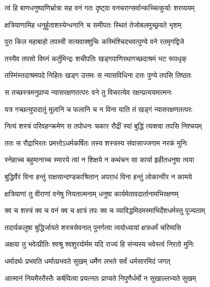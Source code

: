 \twolineshloka
{त्वं हि बाणधनुष्पाणिर्भ्रात्रा सह वनं गतः}
{दृष्ट्वा वनचरान्सर्वान्कच्चित्कुर्याः शरव्ययम्} %

\twolineshloka
{क्षत्रियाणामिह धनुर्हुताशस्येन्धनानि च}
{समीपतः स्थितं तेजोबलमुच्छ्रयते भृशम्} %

\twolineshloka
{पुरा किल महाबाहो तपस्वी सत्यवाक्शुचिः}
{कस्मिंश्चिदभवत्पुण्ये वने रतमृगद्विजे} %

\twolineshloka
{तस्यैव तपसो विघ्नं कर्तुमिन्द्रः शचीपतिः}
{खड्गपाणिरथागच्छदाश्रमं भट रूपधृक्} %

\twolineshloka
{तस्मिंस्तदाश्रमपदे निहितः खड्ग उत्तमः}
{स न्यासविधिना दत्तः पुण्ये तपसि तिष्ठतः} %

\twolineshloka
{स तच्छस्त्रमनुप्राप्य न्यासरक्षणतत्परः}
{वने तु विचरत्येव रक्षन्प्रत्ययमात्मनः} %

\twolineshloka
{यत्र गच्छत्युपादातुं मूलानि च फलानि च}
{न विना याति तं खड्गं न्यासरक्षणतत्परः} %

\twolineshloka
{नित्यं शस्त्रं परिवहन्क्रमेण स तपोधनः}
{चकार रौद्रीं स्वां बुद्धिं त्यक्त्वा तपसि निश्चयम्} %

\twolineshloka
{ततः स रौद्राभिरतः प्रमत्तोऽधर्मकर्षितः}
{तस्य शस्त्रस्य संवासाज्जगाम नरकं मुनिः} %

\twolineshloka
{स्नेहाच्च बहुमानाच्च स्मारये त्वां न शिक्षये}
{न कथंचन सा कार्या हृहीतधनुषा त्वया} %

\twolineshloka
{बुद्धिर्वैरं विना हन्तुं राक्षसान्दण्डकाश्रितान्}
{अपराधं विना हन्तुं लोकान्वीर न कामये} %

\twolineshloka
{क्षत्रियाणां तु वीराणां वनेषु नियतात्मनाम्}
{धनुषा कार्यमेतावदार्तानामभिरक्षणम्} %

\twolineshloka
{क्व च शस्त्रं क्व च वनं क्व च क्षात्रं तपः क्व च}
{व्याविद्धमिदमस्माभिर्देशधर्मस्तु पूज्यताम्} %

\twolineshloka
{तदार्यकलुषा बुद्धिर्जायते शस्त्रसेवनात्}
{पुनर्गत्वा त्वयोध्यायां क्षत्रधर्मं चरिष्यसि} %

\twolineshloka
{अक्षया तु भवेत्प्रीतिः श्वश्रू श्वशुरयोर्मम}
{यदि राज्यं हि संन्यस्य भवेस्त्वं निरतो मुनिः} %

\twolineshloka
{धर्मादर्थः प्रभवति धर्मात्प्रभवते सुखम्}
{धर्मेण लभते सर्वं धर्मसारमिदं जगत्} %

\twolineshloka
{आत्मानं नियमैस्तैस्तैः कर्षयित्वा प्रयत्नतः}
{प्राप्यते निपुणैर्धर्मो न सुखाल्लभ्यते सुखम्} %


